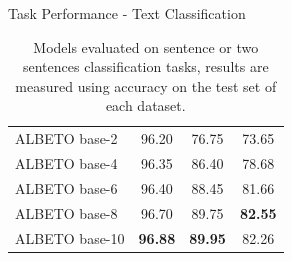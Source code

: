 \documentclass[aspectratio=169,xcolor=dvipsnames]{beamer}
\begin{document}
\begin{frame}{Task Performance - Text Classification}
\begin{table}[]
\begin{center}
{\begin{tabular}{lccc}
ALBETO base-2     & 96.20          & 76.75           & 73.65          \\
ALBETO base-4     & 96.35          & 86.40           & 78.68          \\
ALBETO base-6     & 96.40          & 88.45           & 81.66          \\
ALBETO base-8     & 96.70          & 89.75           & \textbf{82.55} \\
ALBETO base-10    & \textbf{96.88} & \textbf{89.95}  & 82.26          \\ \hline
\end{tabular}}
\end{center}
\caption{Models evaluated on sentence or two sentences classification tasks, results are measured using accuracy on the test set of each dataset.}
\label{table:results-mldoc-pawsx-xnli}
\end{table}

\end{frame}
\end{document}
